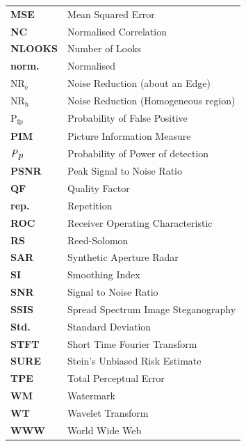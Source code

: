 \documentclass[12pt]{report}
\renewcommand{\baselinestretch}{1.5}
\begin{document}
\begin{table}[!ht]
\footnotesize
\begin{tabular}{p{3cm}l} \\
{\bf MSE}       & Mean Squared Error \\
{\bf NC}        & Normalised Correlation \\
{\bf NLOOKS}    & Number of Looks \\
{\bf norm.}     & Normalised \\
{\bf $\mbox{NR}_{\mbox{e}}$}     & Noise Reduction (about an Edge)\\
{\bf $\mbox{NR}_{\mbox{h}}$}     & Noise Reduction (Homogeneous region)\\
{\bf $\mbox{P}_{\mbox{fp}}$}      & Probability of False Positive \\
{\bf PIM}       & Picture Information Measure \\
{\bf $\mbox{\emph{P}}_{\mbox{\emph{p}}}$}       & Probability of Power of detection \\
{\bf PSNR}      & Peak Signal to Noise Ratio \\
{\bf QF}        & Quality Factor \\
{\bf rep.}      & Repetition \\
{\bf ROC}       & Receiver Operating Characteristic \\
{\bf RS}        & Reed-Solomon \\
{\bf SAR}       & Synthetic Aperture Radar \\
{\bf SI}       & Smoothing Index\\
{\bf SNR}               & Signal to Noise Ratio \\
{\bf SSIS}      & Spread Spectrum Image Steganography \\
{\bf Std.}      & Standard Deviation \\
{\bf STFT}              & Short Time Fourier Transform \\
{\bf SURE}      & Stein's Unbiased Risk Estimate \\
{\bf TPE}               & Total Perceptual Error \\
{\bf WM}        & Watermark \\
{\bf WT}        & Wavelet Transform \\
{\bf WWW}       & World Wide Web \\
\end{tabular}
\end{table}

\renewcommand{\baselinestretch}{1.5}
\normalsize
\end{document}
